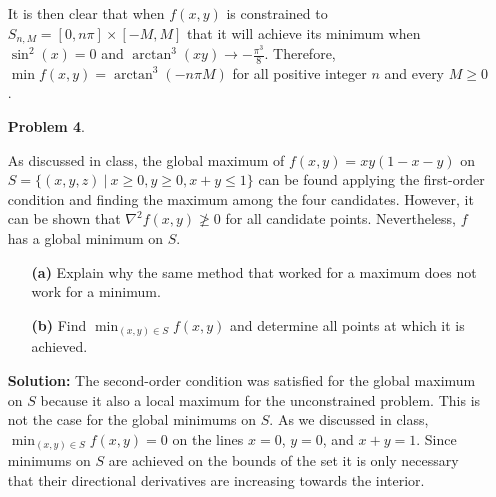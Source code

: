 \documentclass[12pt,letterpaper]{article}
\begin{document}
\begin{enumerate}
{    It is then clear that when $f(x,y)$ is constrained to $S_{n,M}=[0,n \pi]\times [-M,M]$ that it will achieve its minimum when $\sin^2(x)=0$ and $\arctan^3(xy)\to -\frac{\pi^3}{8}$. Therefore, $\min f(x,y)=\arctan^3(-n \pi M)$ for all positive integer $n$ and every $M\geq 0$.
    }
    
    \item[\textbf{Problem 4}.] {
    As discussed in class, the global maximum of $f(x,y)=xy(1-x-y)$ on $S=\{(x,y,z)~|~x\geq 0, y\geq 0, x+y\leq 1\}$ can be found applying the first-order condition and finding the maximum among the four candidates. However, it can be shown that $\nabla^2 f(x,y)\not\geq 0$ for all candidate points. Nevertheless, $f$ has a global minimum on $S$. 
    \begin{enumerate}
        \item[\textbf{(a)}] Explain why the same method that worked for a maximum does not work for a minimum.
        \item[\textbf{(b)}] Find $\min_{(x,y)\in S}f(x,y)$ and determine all points at which it is achieved.
    \end{enumerate}
    }
    \item[\textbf{Solution:}] {
    The second-order condition was satisfied for the global maximum on $S$ because it also a local maximum for the unconstrained problem. This is not the case for the global minimums on $S$. As we discussed in class, $\min_{(x,y)\in S}f(x,y)=0$ on the lines $x=0$, $y=0$, and $x+y=1$. Since minimums on $S$ are achieved on the bounds of the set it is only necessary that their directional derivatives are increasing towards the interior.
    }
\end{enumerate}
\end{document}
